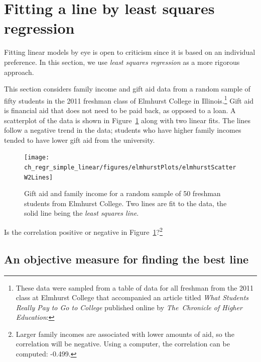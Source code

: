 \section[Fitting a line by least squares regression]{Fitting a line by least squares regression }
\label{fittingALineByLSR}


Fitting linear models by eye is open to criticism since it is based on an individual preference. In this section, we use \emph{least squares regression} as a more rigorous approach.

This section considers family income and gift aid data from a random sample of fifty students in the 2011 freshman class of Elmhurst College in Illinois.\footnote{These data were sampled from a table of data for all freshman from the 2011 class at Elmhurst College that accompanied an article titled \emph{What Students Really Pay to Go to College} published online by \emph{The~Chronicle of Higher Education}: } Gift aid is financial aid that does not need to be paid back, as opposed to a loan. A scatterplot of the data is shown in Figure~\ref{elmhurstScatterW2Lines} along with two linear fits. The lines follow a negative trend in the data; students who have higher family incomes tended to have lower gift aid from the university.

\begin{figure}
\centering
\texttt{[image: ch\_regr\_simple\_linear/figures/elmhurstPlots/elmhurstScatterW2Lines]}
\caption{Gift aid and family income for a random sample of 50 freshman students from Elmhurst College. Two lines are fit to the data, the solid line being the \emph{least squares line}.}
\label{elmhurstScatterW2Lines}
\end{figure}

\begin{exercise}
Is the correlation positive or negative in Figure~\ref{elmhurstScatterW2Lines}?\footnote{Larger family incomes are associated with lower amounts of aid, so the correlation will be negative. Using a computer, the correlation can be computed: -0.499.}
\end{exercise}


\subsection{An objective measure for finding the best line}

